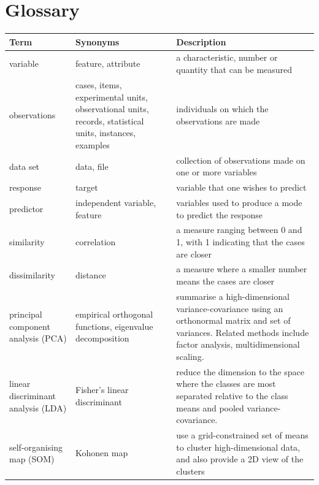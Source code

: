 \documentclass[
  letterpaper,
]{krantz}
\begin{document}
\chapter{Glossary}\label{glossary}

\begin{table}
\centering
\begin{tabular}{>{\raggedright\arraybackslash}p{2cm}>{\raggedright\arraybackslash}p{4cm}>{\raggedright\arraybackslash}p{6cm}}
\toprule
Term & Synonyms & Description\\
\midrule
variable & feature, attribute & a characteristic, number or quantity that can be measured\\
\midrule
observations & cases, items, experimental units, observational units, records, statistical units, instances, examples & individuals on which the observations are made\\
\midrule
data set & data, file & collection of observations made on one or more variables\\
\midrule
response & target & variable that one wishes to predict\\
\midrule
predictor & independent variable, feature & variables used to produce a mode to predict the response\\
\midrule
\addlinespace
similarity & correlation & a measure ranging between 0 and 1, with 1 indicating that the cases are closer\\
\midrule
dissimilarity & distance & a measure where a smaller number means the cases are closer\\
\midrule
principal component analysis (PCA) & empirical orthogonal functions, eigenvalue decomposition & summarise a high-dimensional variance-covariance using an orthonormal matrix and set of variances. Related methods include factor analysis, multidimensional scaling.\\
\midrule
linear discriminant analysis (LDA) & Fisher's linear discriminant & reduce the dimension to the space where the classes are most separated relative to the class means and pooled variance-covariance.\\
\midrule
self-organising map (SOM) & Kohonen map & use a grid-constrained set of means to cluster high-dimensional data, and also provide a 2D view of the clusters\\
\bottomrule
\end{tabular}
\end{table}



\printindex
\end{document}
